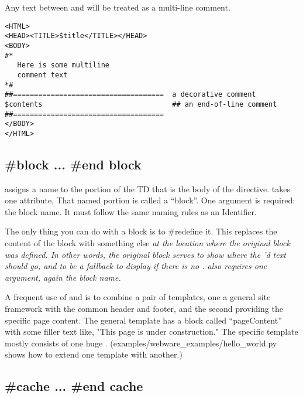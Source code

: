 {Any text between \code{\#*} and \code{*\#} will be treated as a multi-line
comment.
\begin{verbatim}
<HTML>
<HEAD><TITLE>$title</TITLE></HEAD>
<BODY>
#*
   Here is some multiline
   comment text
*#
##====================================  a decorative comment
$contents                               ## an end-of-line comment
##====================================
</BODY>
</HTML>
\end{verbatim}


\subsection{\#block ... \#end block}

 assigns a name to the portion of the TD that is the body of the
directive.   takes one attribute, That named portion is called a
``block''.  One argument is required: the block name.  It must follow the same
naming rules as an Identifier.

The only thing you can do with a block is to \#redefine it.  This replaces
the content of the block with something else \em{at the location where the
original block was defined}.  In other words, the original block serves to
show \em{where} the 'd text should go, and to be a fallback to
display if there is no .   also requires one
argument, again the block name.

A frequent use of  and  is to combine a pair of
templates, one a general site framework with the common header and footer, and
the second providing the specific page content.  The general template has a
block called ``pageContent'' with some filler text like, "This page is under
construction."  The specific template mostly consists of one huge
.  (examples/webware\_examples/hello\_world.py shows how to
extend one template with another.)



\subsection{\#cache ... \#end cache}

}
